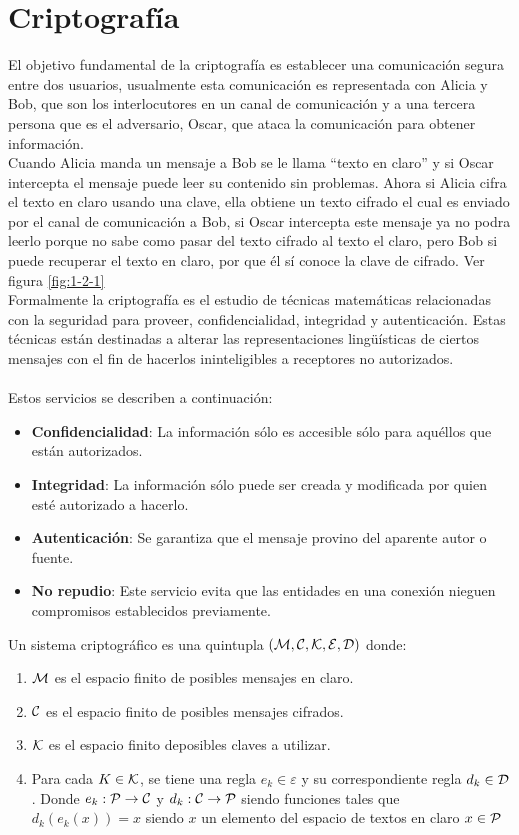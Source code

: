 \section{Criptografía}


El objetivo fundamental de la criptografía es establecer una comunicación segura entre dos usuarios, usualmente esta comunicación es representada con Alicia y Bob, que son los interlocutores en un canal de comunicación y a una tercera persona que es el adversario, Oscar, que ataca la comunicación para obtener información. \\
Cuando Alicia manda un mensaje a Bob se le llama “texto en claro” y si Oscar intercepta el mensaje puede leer su contenido sin problemas. Ahora si Alicia cifra el texto en claro usando una clave, ella obtiene un texto cifrado el cual es enviado por el canal de comunicación a Bob, si Oscar intercepta este mensaje ya no podra leerlo porque no sabe como pasar del texto cifrado al texto el claro, pero Bob si puede recuperar el texto en claro, por que él sí conoce la clave de cifrado.\cite{stinson} Ver figura \ref{fig:1-2-1}\\

Formalmente la criptografía es el estudio de técnicas matemáticas relacionadas con la seguridad para proveer, confidencialidad, integridad y autenticación. Estas técnicas están destinadas a alterar las representaciones lingüísticas de ciertos mensajes con el fin de hacerlos ininteligibles a receptores no autorizados.\cite{cri}\\\\
Estos servicios se describen a continuación:
\begin{itemize}
 \item \textbf{Confidencialidad}:  La  información  sólo es  accesible  sólo  para  aquéllos  que  están autorizados.
 \item \textbf{Integridad}:  La información sólo puede ser creada y modificada por quien esté autorizado a hacerlo.
 \item \textbf{Autenticación}: Se garantiza que el mensaje provino del aparente autor o fuente.
 \item \textbf{No repudio}:  Este servicio evita que las entidades en una conexión nieguen compromisos establecidos previamente.
\end{itemize}

Un sistema criptográfico es una quintupla $(\cal M,C,K,E,D)$ donde:

\begin{enumerate}
 \item $\cal M$ es el espacio finito de posibles mensajes en claro.
 \item $\cal C$ es el espacio finito de posibles mensajes cifrados.
 \item $\cal K$ es el espacio finito deposibles claves a utilizar.
 \item Para cada $K \in \cal K$, se tiene una regla $e_k\in \varepsilon$ y su correspondiente regla $d_k\in \cal D$. Donde $e_k :\cal P\rightarrow C$ y $d_k:\cal C\rightarrow P$ siendo funciones tales que $d_k(e_k(x))=x$ siendo $x$ un elemento del espacio de textos en claro $x\in\cal P$
\end{enumerate}



